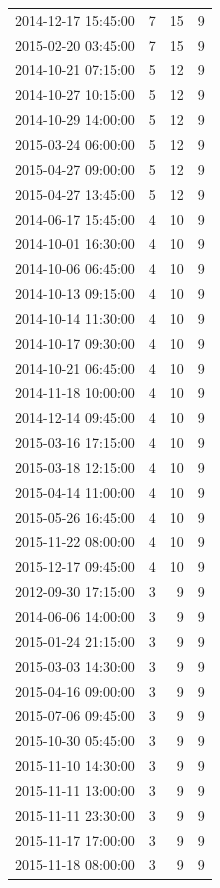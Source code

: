 \begin{tabular}{lrrr}
2014-12-17 15:45:00 & 7 & 15 & 9 \\
2015-02-20 03:45:00 & 7 & 15 & 9 \\
2014-10-21 07:15:00 & 5 & 12 & 9 \\
2014-10-27 10:15:00 & 5 & 12 & 9 \\
2014-10-29 14:00:00 & 5 & 12 & 9 \\
2015-03-24 06:00:00 & 5 & 12 & 9 \\
2015-04-27 09:00:00 & 5 & 12 & 9 \\
2015-04-27 13:45:00 & 5 & 12 & 9 \\
2014-06-17 15:45:00 & 4 & 10 & 9 \\
2014-10-01 16:30:00 & 4 & 10 & 9 \\
2014-10-06 06:45:00 & 4 & 10 & 9 \\
2014-10-13 09:15:00 & 4 & 10 & 9 \\
2014-10-14 11:30:00 & 4 & 10 & 9 \\
2014-10-17 09:30:00 & 4 & 10 & 9 \\
2014-10-21 06:45:00 & 4 & 10 & 9 \\
2014-11-18 10:00:00 & 4 & 10 & 9 \\
2014-12-14 09:45:00 & 4 & 10 & 9 \\
2015-03-16 17:15:00 & 4 & 10 & 9 \\
2015-03-18 12:15:00 & 4 & 10 & 9 \\
2015-04-14 11:00:00 & 4 & 10 & 9 \\
2015-05-26 16:45:00 & 4 & 10 & 9 \\
2015-11-22 08:00:00 & 4 & 10 & 9 \\
2015-12-17 09:45:00 & 4 & 10 & 9 \\
2012-09-30 17:15:00 & 3 & 9 & 9 \\
2014-06-06 14:00:00 & 3 & 9 & 9 \\
2015-01-24 21:15:00 & 3 & 9 & 9 \\
2015-03-03 14:30:00 & 3 & 9 & 9 \\
2015-04-16 09:00:00 & 3 & 9 & 9 \\
2015-07-06 09:45:00 & 3 & 9 & 9 \\
2015-10-30 05:45:00 & 3 & 9 & 9 \\
2015-11-10 14:30:00 & 3 & 9 & 9 \\
2015-11-11 13:00:00 & 3 & 9 & 9 \\
2015-11-11 23:30:00 & 3 & 9 & 9 \\
2015-11-17 17:00:00 & 3 & 9 & 9 \\
2015-11-18 08:00:00 & 3 & 9 & 9 \\

\end{tabular}
